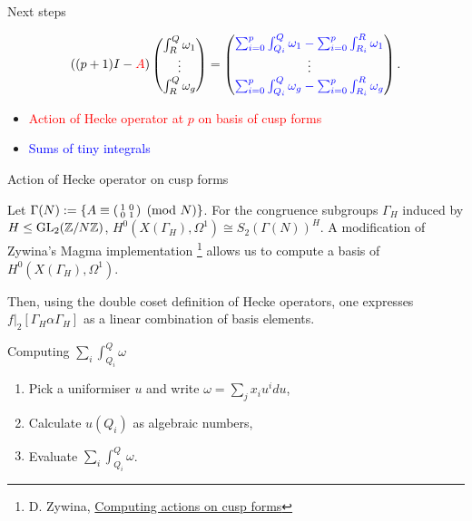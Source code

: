 \begin{frame}{Next steps}

\begin{equation*}
   ((p+1)I-\textcolor{red}{A})\begin{pmatrix} \int^Q_R\omega_1 \\\vdots \\ \int^Q_R\omega_g \end{pmatrix} =  \begin{pmatrix} \textcolor{blue}{\sum_{i=0}^{p}\int^Q_{Q_i} \omega_1 - \sum_{i=0}^{p}\int^R_{R_i} \omega_1} \\\vdots \\ \textcolor{blue}{\sum_{i=0}^{p}\int^Q_{Q_i} \omega_g - \sum_{i=0}^{p}\int^R_{R_i} \omega_g} \end{pmatrix}.
\end{equation*}

\begin{itemize}
\item \textcolor{red}{Action of Hecke operator at $p$ on basis of cusp forms}
\item \textcolor{blue}{Sums of tiny integrals}
\end{itemize}

\end{frame}

\begin{frame}{Action of Hecke operator on cusp forms}

Let $\Gamma(N) := \{ A \equiv \begin{psmallmatrix} 1 & 0 \\ 0 & 1 \end{psmallmatrix} \pmod{N} \}$. For the congruence subgroups $\Gamma_H$ induced by $H \leq \operatorname{GL}_2(\mathbb{Z}/N\mathbb{Z})$, $H^0(X(\Gamma_H),\Omega^1) \cong S_2(\Gamma(N))^H$. A modification of Zywina's Magma implementation \footnote{D. Zywina, \href{https://arxiv.org/abs/2001.07270}{Computing actions on cusp forms}} allows us to compute a basis of $H^0(X(\Gamma_H),\Omega^1)$.

Then, using the double coset definition of Hecke operators, one expresses $f|_2 [\Gamma_H \alpha \Gamma_H]$ as a linear combination of basis elements.
\end{frame}

\begin{frame}{Computing $\sum_i \int_{Q_i}^Q \omega $}
\begin{enumerate}
\item Pick a uniformiser $u$ and write $\omega = \sum_j x_i u^i du$,
\item Calculate $u(Q_i)$ as algebraic numbers,
\item Evaluate $\sum_i \int_{Q_i}^Q \omega $.
\end{enumerate}
\end{frame}

